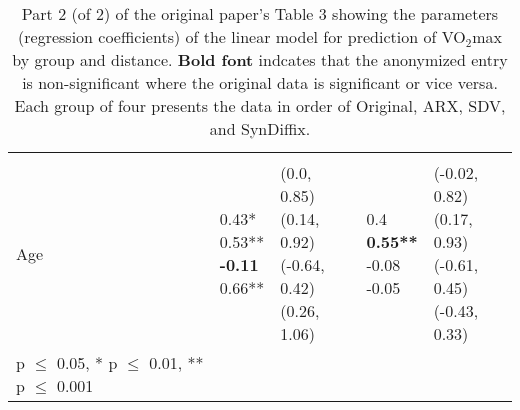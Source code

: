 \documentclass[10pt]{article}
\begin{document}
\begin{table}
\begin{center}
\begin{small}
\begin{tabular}{lllll}
& & & & \\ 
\quad Age    &  \makecell[l]{\textnormal{0.43*\phantom{**}} \\\textnormal{0.53**\phantom{*}} \\\textbf{-0.11\phantom{***}} \\\textnormal{0.66**\phantom{*}} \\}   &  \makecell[l]{\textnormal{(0.0, 0.85)} \\\textnormal{(0.14, 0.92)} \\\textnormal{(-0.64, 0.42)} \\\textnormal{(0.26, 1.06)} \\}   &  \makecell[l]{\textnormal{0.4\phantom{***}} \\\textbf{0.55**\phantom{*}} \\\textnormal{-0.08\phantom{***}} \\\textnormal{-0.05\phantom{***}} \\}   &  \makecell[l]{\textnormal{(-0.02, 0.82)} \\\textnormal{(0.17, 0.93)} \\\textnormal{(-0.61, 0.45)} \\\textnormal{(-0.43, 0.33)} \\} \\ 

      \bottomrule
      {\footnotesize * p $\leq$ 0.05, \quad** p $\leq$ 0.01, \quad*** p $\leq$ 0.001}
      \end{tabular}
      \end{small}
      \caption{Part 2 (of 2) of the original paper's Table 3 showing the parameters (regression coefficients) of the linear model for prediction of VO$_2$max by group and distance. \textbf{Bold font} indcates that the anonymized entry is non-significant where the original data is significant or vice versa. Each group of four presents the data in order of Original, ARX, SDV, and SynDiffix. 
      }
      \label{tab:table3b}
      \end{center}
      \end{table}
      \setlength{\fboxsep}{3pt}
    


\end{document}
